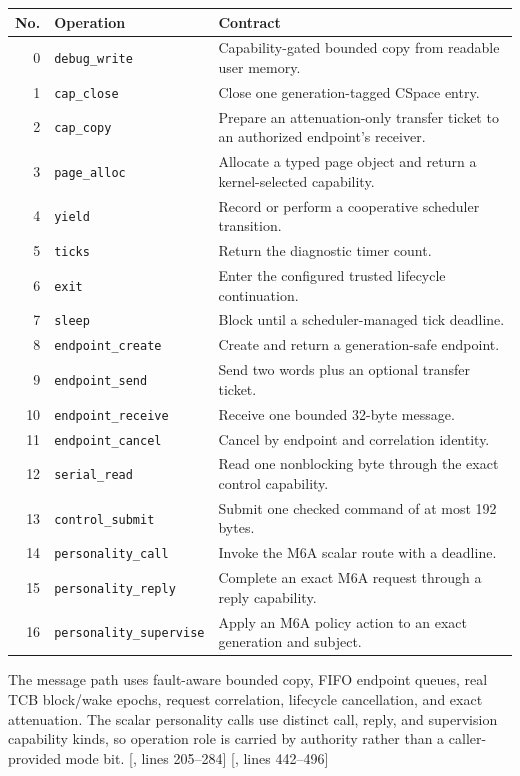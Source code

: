 \documentclass[11pt,oneside]{article}
\newcommand{\src}[2]{\textcolor{OSlate}{\scriptsize[\path{#1}, lines #2]}\allowbreak}
\begin{document}
\begin{longtable}{r P{0.28\textwidth} P{0.56\textwidth}}
\toprule
\textbf{No.} & \textbf{Operation} & \textbf{Contract} \\
\midrule
{} & \texttt{debug\_write} & Capability-gated bounded copy from readable user memory. \\
1 & \texttt{cap\_close} & Close one generation-tagged CSpace entry. \\
2 & \texttt{cap\_copy} & Prepare an attenuation-only transfer ticket to an authorized endpoint's receiver. \\
3 & \texttt{page\_alloc} & Allocate a typed page object and return a kernel-selected capability. \\
4 & \texttt{yield} & Record or perform a cooperative scheduler transition. \\
5 & \texttt{ticks} & Return the diagnostic timer count. \\
6 & \texttt{exit} & Enter the configured trusted lifecycle continuation. \\
7 & \texttt{sleep} & Block until a scheduler-managed tick deadline. \\
8 & \texttt{endpoint\_create} & Create and return a generation-safe endpoint. \\
9 & \texttt{endpoint\_send} & Send two words plus an optional transfer ticket. \\
10 & \texttt{endpoint\_receive} & Receive one bounded 32-byte message. \\
11 & \texttt{endpoint\_cancel} & Cancel by endpoint and correlation identity. \\
12 & \texttt{serial\_read} & Read one nonblocking byte through the exact control capability. \\
13 & \texttt{control\_submit} & Submit one checked command of at most 192 bytes. \\
14 & \texttt{personality\_call} & Invoke the M6A scalar route with a deadline. \\
15 & \texttt{personality\_reply} & Complete an exact M6A request through a reply capability. \\
16 & \texttt{personality\_supervise} & Apply an M6A policy action to an exact generation and subject. \\
\bottomrule
\end{longtable}

The message path uses fault-aware bounded copy, FIFO endpoint queues, real TCB
block/wake epochs, request correlation, lifecycle cancellation, and exact
attenuation. The scalar personality calls use distinct call, reply, and
supervision capability kinds, so operation role is carried by authority rather
than a caller-provided mode bit. \src{docs/OCORE.md}{205--284}
\src{docs/OCORE.md}{442--496}
\end{document}
